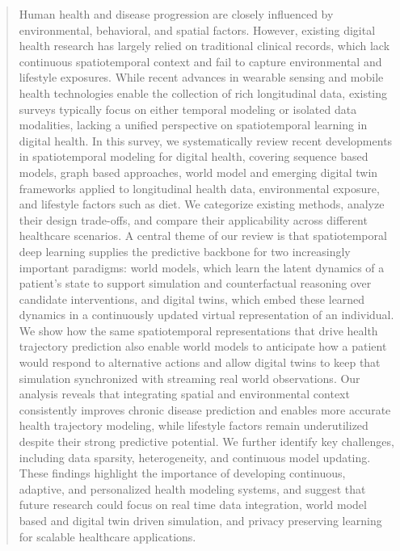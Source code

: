 \documentclass[acmsmall]{acmart}
\begin{document}
\begin{abstract}
Human health and disease progression are closely influenced by environmental, behavioral, and spatial factors. However, existing digital health research has largely relied on traditional clinical records, which lack continuous spatiotemporal context and fail to capture environmental and lifestyle exposures. While recent advances in wearable sensing and mobile health technologies enable the collection of rich longitudinal data, existing surveys typically focus on either temporal modeling or isolated data modalities, lacking a unified perspective on spatiotemporal learning in digital health. In this survey, we systematically review recent developments in spatiotemporal modeling for digital health, covering sequence based models, graph based approaches, world model and emerging digital twin frameworks applied to longitudinal health data, environmental exposure, and lifestyle factors such as diet. We categorize existing methods, analyze their design trade-offs, and compare their applicability across different healthcare scenarios. A central theme of our review is that spatiotemporal deep learning supplies the predictive backbone for two increasingly important paradigms: world models, which learn the latent dynamics of a patient's state to support simulation and counterfactual reasoning over candidate interventions, and digital twins, which embed these learned dynamics in a continuously updated virtual representation of an individual. We show how the same spatiotemporal representations that drive health trajectory prediction also enable world models to anticipate how a patient would respond to alternative actions and allow digital twins to keep that simulation synchronized with streaming real world observations. Our analysis reveals that integrating spatial and environmental context consistently improves chronic disease prediction and enables more accurate health trajectory modeling, while lifestyle factors remain underutilized despite their strong predictive potential. We further identify key challenges, including data sparsity, heterogeneity, and continuous model updating. These findings highlight the importance of developing continuous, adaptive, and personalized health modeling systems, and suggest that future research could focus on real time data integration, world model based and digital twin driven simulation, and privacy preserving learning for scalable healthcare applications.

\end{abstract}
\end{document}
